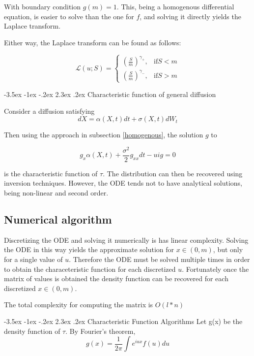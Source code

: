 \documentclass[12pt]{article}
\makeatletter
\renewcommand\section{\@startsection{section}{1}{\z@}%
                                  {-3.5ex \@plus -1ex \@minus -.2ex}%
                                  {2.3ex \@plus.2ex}%
                                  {\normalfont\large\bfseries}}
\makeatother
\begin{document}
With boundary condition \(g(m)=1\).  This, being a homogenous differential equation, is easier to solve than the one for \(f\), and solving it directly yields the Laplace transform.  

Either way, the Laplace transform can be found as follows:

\begin{equation}
\mathcal{L}(u; S)=\left\{
\begin{array}{rl}
\left(\frac{S}{m} \right) ^ {\gamma_{+}} , & \mathrm{if}  S<m \\
\left(\frac{S}{m} \right) ^ {\gamma_{-}}, & \mathrm{if} S>m
\end{array}
\right.
\end{equation}

\section{Characteristic function of general diffusion}

Consider a diffusion satisfying
\[dX=\alpha(X, t)dt+\sigma(X, t)dW_t\]

Then using the approach in subsection \ref{homogenous}, the solution \(g\) to 

\[g_x \alpha(X, t)+ \frac{\sigma^2}{2}g_{xx} dt- uig=0\]

is the characteristic function of \(\tau\).  The distribution can then be recovered using inversion techniques.  However, the ODE tends not to have analytical solutions, being non-linear and second order.  

\subsection{Numerical algorithm}

Discretizing the ODE and solving it numerically is has linear complexity.  Solving the ODE in this way yields the approximate solution for \(x \in (0, m)\), but only for a single value of \(u\).  Therefore the ODE must be solved multiple times in order to obtain the characeteristic function for each discretized \(u\).  Fortunately once the matrix of values is obtained the density function can be recovered for each discretized \(x \in (0, m)\).

The total complexity for computing the matrix is \(O(l*n)\)


\section{Characteristic Function Algorithms}
Let g(x) be the density function of \(\tau\).  By Fourier's theorem, 
\[g(x)=\frac{1}{2\pi} \int e^{iux} f(u) du \]
\end{document}
